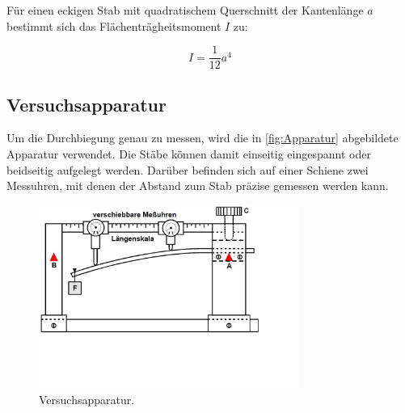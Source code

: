 Für einen eckigen Stab mit quadratischem Querschnitt der Kantenlänge $a$ bestimmt sich das Flächenträgheitsmoment $I$ zu: 

\begin{equation}
    I=\frac{1}{12}a^{4}
    \label{eq:Flächenträgheitsmoment eckig}
\end{equation}

\subsection{Versuchsapparatur}
\label{sec:Apparatur}

Um die Durchbiegung genau zu messen, wird die in \autoref{fig:Apparatur} abgebildete Apparatur verwendet.
Die Stäbe können damit einseitig eingespannt oder beidseitig aufgelegt werden.
Darüber befinden sich auf einer Schiene zwei Messuhren, mit denen der Abstand zum Stab präzise gemessen werden kann.

\begin{figure} [H]
    \centering
    \includegraphics[height=6cm]{content/Abbildungen/Apparatur.pdf}
    \caption{Versuchsapparatur. \cite{v103}}
    \label{fig:Apparatur}
\end{figure}